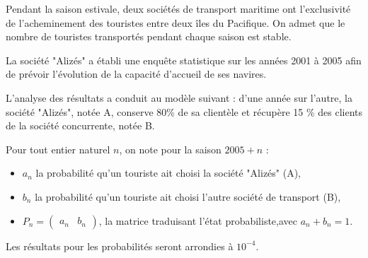 
%
Pendant la saison estivale, deux sociétés de transport maritime ont l'exclusivité de l'acheminement des touristes entre deux îles du Pacifique. On admet que le nombre de touristes transportés pendant chaque saison est stable.
\par
La société "Alizés" a établi une enquête statistique sur les années 2001 à 2005 afin de prévoir l'évolution de la capacité d'accueil de ses navires.
\par
L'analyse des résultats a conduit au modèle suivant : d'une année sur l'autre, la société "Alizés", notée A, conserve 80\% de sa clientèle et récupère 15 \% des clients de la société concurrente, notée B.
\par
Pour tout entier naturel $n$, on note pour la saison $2005+n$ :\begin{itemize}
     \item
     $a_{n}$ la probabilité qu'un touriste ait choisi la société "Alizés" (A),
     \item
     $b_{n}$ la probabilité qu'un touriste ait choisi l'autre société de transport (B),
     \item
     $P_{n}=\begin{pmatrix} a_{n} & b_{n }\end{pmatrix}$, la matrice traduisant l'état probabiliste,avec $a_{n}+b_{n}=1$.
\end{itemize}
Les résultats pour les probabilités seront arrondies à $10^{-4}$.
